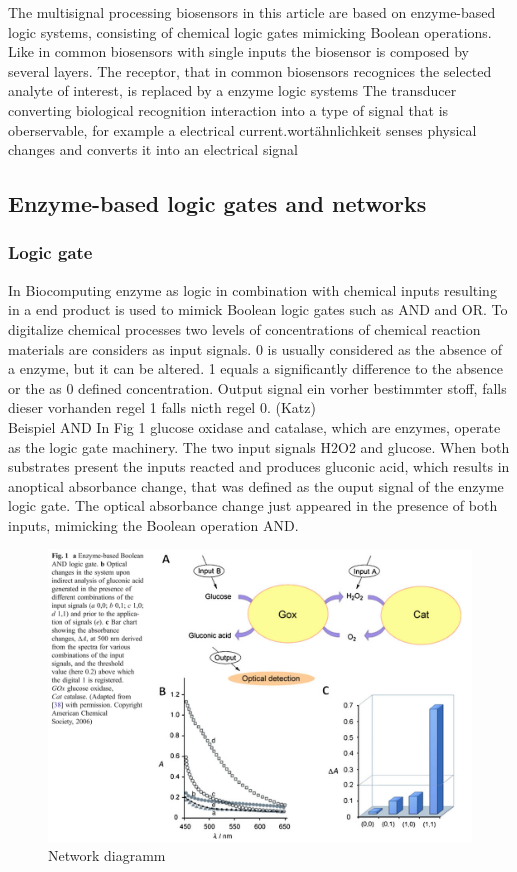 \documentclass[runningheads]{llncs}
\begin{document}
The multisignal processing biosensors in this article are based on enzyme-based logic systems, consisting of chemical logic gates mimicking Boolean operations. Like in common biosensors with single inputs the biosensor is composed by several layers. The receptor, that in common biosensors recognices the selected analyte of interest, is replaced by a enzyme logic systems
The transducer converting biological recognition interaction into a type of signal that is oberservable, for example a electrical current.wortähnlichkeit senses physical changes and converts it into an electrical signal

\subsection{Enzyme-based logic gates and networks}
	
	\subsubsection{Logic gate}
	
	In Biocomputing enzyme as logic in combination with chemical inputs resulting in a end product is used to mimick Boolean logic gates such as AND and OR. To digitalize chemical processes two levels of concentrations of chemical reaction materials are considers as input signals. 0 is usually considered as the absence of a enzyme, but it can be altered. 1 equals a  significantly difference to the absence or the as 0 defined concentration.
	Output signal ein vorher bestimmter stoff, falls dieser vorhanden regel 1 falls nicth regel 0.  
	(Katz) \\
	
	Beispiel AND 
	In Fig 1 glucose oxidase and catalase, which are enzymes, operate as the logic gate machinery. The two input signals H2O2 and glucose. When both substrates present the inputs reacted and produces gluconic acid, which results in anoptical absorbance change, that was defined as the ouput signal of the enzyme logic gate. The optical absorbance change just appeared in the presence of both inputs, mimicking the Boolean operation AND. 

	\begin{figure}[H] \centering \includegraphics[scale= 0.3]{pics/AND.png} \caption{Network diagramm} \label{img:and} \end{figure}
	
\end{document}

